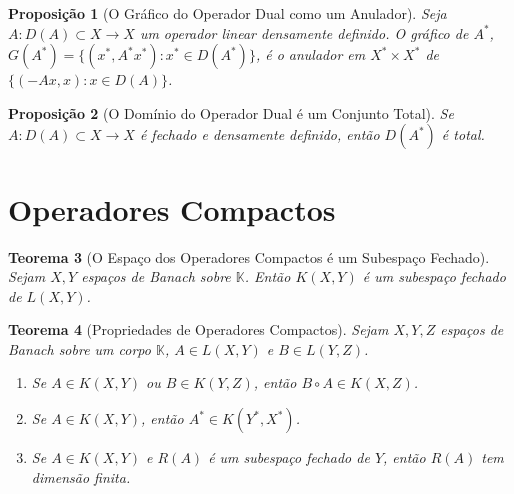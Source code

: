 \documentclass[12pt]{article}
\newtheorem{theorem}{Teorema}[section]
\newtheorem{proposition}[theorem]{Proposição}
\begin{document}
\begin{multicols}{3}
\begin{proposition}[O Gráfico do Operador Dual como um Anulador]
Seja $A: D(A) \subset X \to X$ um operador linear densamente definido. O gráfico de $A^*$, $G(A^*) = \{(x^*, A^*x^*) : x^* \in D(A^*)\}$, é o anulador em $X^* \times X^*$ de $\{(-Ax, x) : x \in D(A)\}$.
\end{proposition}

\begin{proposition}[O Domínio do Operador Dual é um Conjunto Total]
Se $A: D(A) \subset X \to X$ é fechado e densamente definido, então $D(A^*)$ é total.
\end{proposition}
\end{multicols}





\section{Operadores Compactos}
\begin{multicols}{3}
\begin{theorem}[O Espaço dos Operadores Compactos é um Subespaço Fechado]
Sejam $X, Y$ espaços de Banach sobre $\mathbb{K}$. Então $K(X, Y)$ é um subespaço fechado de $L(X, Y)$.
\end{theorem}

\begin{theorem}[Propriedades de Operadores Compactos]
Sejam $X, Y, Z$ espaços de Banach sobre um corpo $\mathbb{K}$, $A \in L(X, Y)$ e $B \in L(Y, Z)$.
\begin{enumerate}[label=(\alph*)]
    \item Se $A \in K(X, Y)$ ou $B \in K(Y, Z)$, então $B \circ A \in K(X, Z)$.
    \item Se $A \in K(X, Y)$, então $A^* \in K(Y^*, X^*)$.
    \item Se $A \in K(X, Y)$ e $R(A)$ é um subespaço fechado de $Y$, então $R(A)$ tem dimensão finita.
\end{enumerate}
\end{theorem}
\end{multicols}
\newpage
\end{document}
